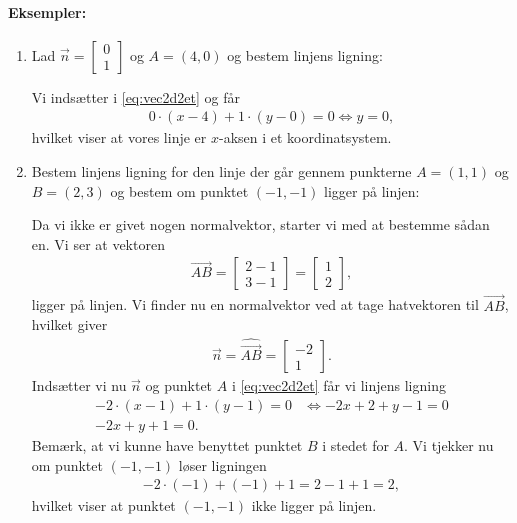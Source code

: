 \paragraph*{Eksempler:}
\begin{enumerate}
\item Lad $\vec{n}=\begin{bmatrix}0 \\ 1\end{bmatrix}$ og $A=(4,0)$ og bestem linjens ligning:

Vi indsætter i \eqref{eq:vec2d2et} og får
\begin{align*}
0 \cdot (x - 4) + 1 \cdot (y-0) = 0 \Leftrightarrow y=0,
\end{align*}
hvilket viser at vores linje er $x$-aksen i et koordinatsystem.
\item Bestem linjens ligning for den linje der går gennem punkterne $A=(1,1)$ og $B=(2,3)$ og bestem om punktet $(-1,-1)$ ligger på linjen:

Da vi ikke er givet nogen normalvektor, starter vi med at bestemme sådan en. Vi ser at vektoren
\begin{align*}
\overrightarrow{AB} = \begin{bmatrix} 2-1 \\ 3-1 \end{bmatrix}= \begin{bmatrix} 1 \\ 2 \end{bmatrix},
\end{align*}
ligger på linjen. Vi finder nu en normalvektor ved at tage hatvektoren til $\overrightarrow{AB}$, hvilket giver
\begin{align*}
\vec{n}=\hat{\overrightarrow{AB}}=\begin{bmatrix} -2 \\ 1 \end{bmatrix}.
\end{align*}
Indsætter vi nu $\vec{n}$ og punktet $A$ i \eqref{eq:vec2d2et} får vi linjens ligning
\begin{align*}
-2\cdot (x-1)+1 \cdot (y-1) = 0 &\Leftrightarrow -2x +2 +y -1 = 0 \\
-2x+y+1=0.
\end{align*}
Bemærk, at vi kunne have benyttet punktet $B$ i stedet for $A$. Vi tjekker nu om punktet $(-1,-1)$ løser ligningen
\begin{align*}
-2 \cdot(-1) + (-1) +1 = 2 - 1+1 = 2,
\end{align*}
hvilket viser at punktet $(-1,-1)$ ikke ligger på linjen.
\end{enumerate}

